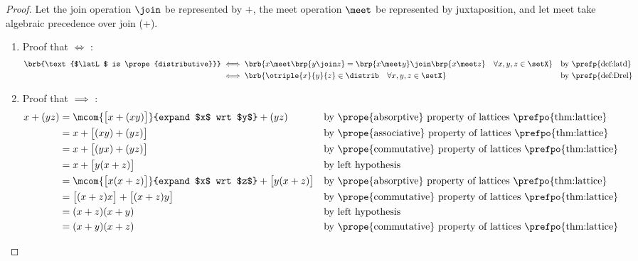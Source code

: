 \begin{proof}
Let the join operation $\join$ be represented by $+$,
    the meet operation $\meet$ be represented by juxtaposition,
and let meet take algebraic precedence over join (+).
\begin{enumerate}
  \item Proof that  $\iff$ : %
    \begin{align*}
      \brb{\text{$\latL$ is \prope{distributive}}}
        &\iff \brb{x\meet\brp{y\join z} = \brp{x\meet y}\join\brp{x\meet z} \quad \forall x,y,z\in\setX}
        && \text{by \prefp{def:latd}}
      \\&\iff \brb{\otriple{x}{y}{z}\in\distrib \quad \forall x,y,z\in\setX}
        && \text{by \prefp{def:Drel}}
    \end{align*}

  \item Proof that  $\implies$ : %
    \begin{align*}
      x + (yz)
        &= \mcom{\big[ x + (x y)\big]}{expand $x$ wrt $y$} + (yz)
        && \text{by \prope{absorptive} property of lattices \prefpo{thm:lattice}}
      \\&= x + \big[ (x y) + (yz) \big]
        && \text{by \prope{associative} property of lattices \prefpo{thm:lattice}}
      \\&= x + \big[ (y x) + (yz) \big]
        && \text{by \prope{commutative} property of lattices \prefpo{thm:lattice}}
      \\&= x + \big[ y(x + z) \big]
        && \text{by left hypothesis}
      \\&= \mcom{\big[ x(x + z)\big]}{expand $x$ wrt $z$}
          + \big[ y(x + z) \big]
        && \text{by \prope{absorptive} property of lattices \prefpo{thm:lattice}}
      \\&= \big[ (x + z)x\big] + \big[ (x + z)y\big]
        && \text{by \prope{commutative} property of lattices \prefpo{thm:lattice}}
      \\&= (x + z)(x + y)
        && \text{by left hypothesis}
      \\&= (x + y)(x + z)
        && \text{by \prope{commutative} property of lattices \prefpo{thm:lattice}}
    \end{align*}


\end{enumerate}
\end{proof}
